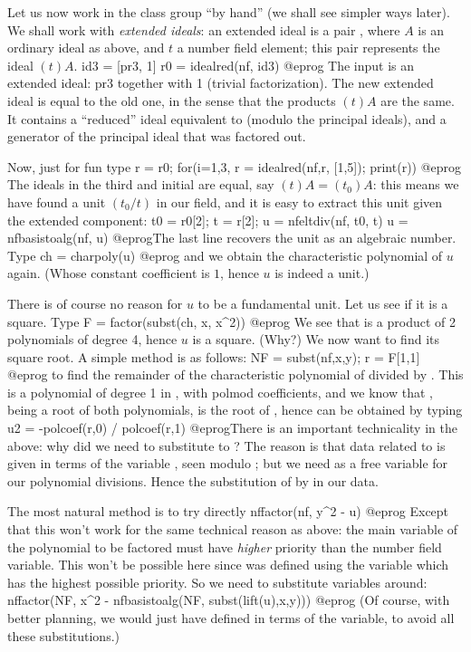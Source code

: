 Let us now work in the class group ``by hand'' (we shall see simpler ways
later). We shall work with \emph{extended ideals}: an extended ideal is a pair
\kbd{[A, t]}, where $A$ is an ordinary ideal as above, and $t$ a number field
element; this pair represents the ideal $(t) A$.
\bprog
  id3 = [pr3, 1]
  r0 = idealred(nf, id3)
@eprog\noindent
The input  is an extended ideal: pr3 together with 1 (trivial
factorization). The new extended ideal  is equal to the old one,
in the sense that the products $(t)A$ are the same. It contains a ``reduced''
ideal equivalent to  (modulo the principal ideals), and a generator
of the principal ideal that was factored out.

Now, just for fun type
\bprog
  r = r0; for(i=1,3, r = idealred(nf,r, [1,5]); print(r))
@eprog\noindent
The ideals in the third  and initial  are equal, say
$(t) A = (t_0) A$: this means we
have found a unit $(t_0/t)$ in our field, and it is easy to extract this unit
given the extended component:
\bprog
  t0 = r0[2]; t = r[2];
  u = nfeltdiv(nf, t0, t)
  u = nfbasistoalg(nf, u)
@eprog\noindent The last line recovers the unit as an algebraic number.
Type
\bprog
  ch = charpoly(u)
@eprog\noindent
and we obtain the characteristic polynomial  of $u$ again. (Whose
constant coefficient is $1$, hence $u$ is indeed a unit.)

There is of course no reason for $u$ to be a fundamental unit. Let us see if
it is a square. Type
\bprog
  F = factor(subst(ch, x, x^2))
@eprog\noindent
We see that  is a product of 2 polynomials of degree 4, hence
$u$ is a square. (Why?) We now want to find its square root. A simple method
is as follows:
\bprog
  NF = subst(nf,x,y);
  r = F[1,1] %
@eprog\noindent
to find the remainder of the characteristic polynomial of  divided by
. This is a polynomial of degree 1 in , with polmod
coefficients, and we know that , being a root of both polynomials,
is the root of , hence can be obtained by typing
\bprog
  u2 = -polcoef(r,0) / polcoef(r,1)
@eprog\noindent There is an important technicality in the above: why did we
need to substitute  to ? The reason is that data related to
 is given in terms of the variable , seen modulo ;
but we need  as a free variable for our polynomial divisions. Hence
the substitution of  by  in our  data.

The most natural method is to try directly
\bprog
  nffactor(nf, y^2 - u)
@eprog\noindent
Except that this won't work for the same technical reason as above: the main
variable of the polynomial to be factored must have \emph{higher} priority
than the number field variable. This won't be possible here since 
was defined using the variable  which has the highest possible
priority. So we need to substitute variables around:
\bprog
  nffactor(NF, x^2 - nfbasistoalg(NF, subst(lift(u),x,y)))
@eprog\noindent
(Of course, with better planning, we would just have defined  in
terms of the  variable, to avoid all these substitutions.)
\smallskip

